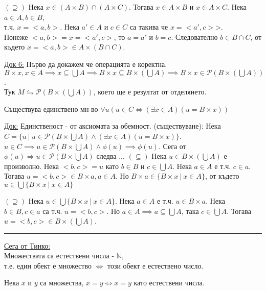 \documentclass[fleqn, titlepage, 12pt]{report}
\begin{document}
$(\supseteq)$ Нека $x \in (A \times  B) \cap (A \times C)$. Тогава $x \in A \times B$ и $x \in A \times C$. Нека
$a \in A, b \in B$,\\
т.ч. $x = <a,b>$. Нека $a' \in A $ и $ c \in C$ са такива че $x = <a',c>$>.\\
Понеже $<a,b> = x = <a',c>$, то $a = a'$ и $b = c$.
Следователно $b \in B \cap C$, от където $x = <a,b> \in A \times (B \cap C)$.
\bigbreak

\underline{Док 6:} Първо да докажем че операцията е коректна.\\
$B \times x, x \in A \implies x \subseteq \bigcup{A} \implies B \times x \subseteq B \times (\bigcup A) \implies
B \times x \in \mathcal{P}(B \times (\bigcup A)) $.\\
Тук $M \leftrightharpoons \mathcal{P}(B \times (\bigcup A))$, което ще е резултат от отделянето.
\bigbreak

 Съществува единствено мн-во $ \forall{u} (u \in C \Leftrightarrow ( \exists{x} \in A)(u = B \times x)) $
\bigbreak

\underline{Док:} Единственост - от аксиомата за обемност.
\bigbreak
(съществуване): Нека $C = \{u\ |\ u \in \mathcal{P}(B \times \bigcup A) \land ( \exists{x \in A})(u = B \times x) \}$.\\
$u \in C \implies u \in \mathcal{P}(B \times  \bigcup{A} ) \land \phi(u) \implies \phi(u)  $.
Сега от $ \phi(u) \Rightarrow u \in \mathcal{P}(B \times  \bigcup{A} )$ следва ...
\bigbreak
$( \subseteq)$ Нека $ u \in B \times ( \bigcup{A} )$ е произволно. Нека $<b,c> = u$ като $b \in B$ и $c \in \bigcup{A} $.
Нека $a \in A$ е т.ч. $c \in a$. Тогава $u = <b,c> \in B \times a, a \in A$.
Но $B \times a \in \{B \times x\ |\ x \in A\}$, от където $u \in \bigcup{ \{B \times x\ |\ x \in A\}} $
\bigbreak

$(\supseteq)$ Нека $u \in \bigcup{ \{B \times x\ |\ x \in A\}} $. Нека $a \in A$ е т.ч. $u \in B \times a$.
Нека $b \in B, c \in a$ са т.ч. $u = <b,c>$. Но $a \in A \implies a \subseteq \bigcup{A}$, така $c \in \bigcup{A} $.
Тогава $u = <b,c> \in B \times ( \bigcup{A} )$.
\bigbreak

\hrule
\bigbreak
\underline{Сега от Тинко:}\\
Множествата са естествени числа - $\mathbb{N}$,\\
т.е. един обект е множество $\Longleftrightarrow $ този обект е естествено число.
\bigbreak

Нека $ x $ и $ y $ са множества, $x = y \Longleftrightarrow x = y$ като естествени числа.
\bigbreak
\end{document}
